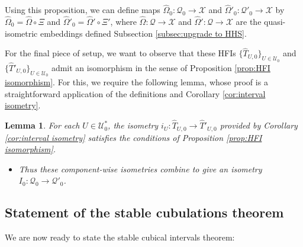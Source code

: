 \documentclass{amsart}
\newtheorem{lemma}[theorem]{Lemma}
\theoremstyle{definition}
\theoremstyle{remark}
\theoremstyle{definition}
\newcommand{\calQ}{\mathcal{Q}}
\newcommand{\calU}{\mathcal{U}}
\newcommand{\calX}{\mathcal{X}}
\newcommand{\hT}{\widehat{T}}
\newcommand{\hO}{\widehat{\Omega}}
\begin{document}
Using this proposition, we can define maps $\hO_0:\calQ_0 \to \calX$ and $\hO'_0:\calQ'_0 \to \calX$ by $\hO_0 = \hO \circ \Xi$ and $\hO'_0 = \hO' \circ \Xi'$, where $\hO:\calQ \to \calX$ and $\hO':\calQ \to \calX$ are the quasi-isometric embeddings defined Subsection \ref{subsec:upgrade to HHS}.

For the final piece of setup, we want to observe that these HFIs $\{\hT_{U,0}\}_{U \in \calU_0}$ and $\{\hT'_{U,0}\}_{U \in \calU_0}$ admit an isomorphism in the sense of Proposition \ref{prop:HFI isomorphism}.  For this, we require the following lemma, whose proof is a straightforward application of the definitions and Corollary \ref{cor:interval isometry}.  

\begin{lemma}\label{lem:interval isometries}
For each $U \in \calU^*_0$, the isometry $i_U:\hT_{U,0} \to \hT'_{U,0}$ provided by Corollary \ref{cor:interval isometry} satisfies the conditions of Proposition \ref{prop:HFI isomorphism}.
\begin{itemize}
\item Thus these component-wise isometries combine to give an isometry $I_0:\calQ_0 \to \calQ'_0$. 
\end{itemize}


\end{lemma}




\subsection{Statement of the stable cubulations theorem}

We are now ready to state the stable cubical intervals theorem:
\end{document}
